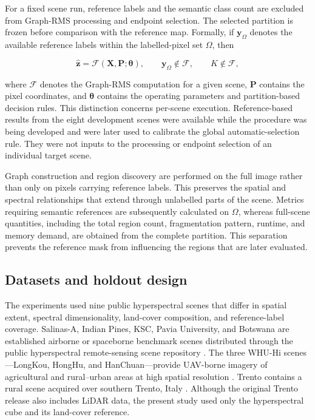 \documentclass[10pt,a4paper,fleqn]{article}
\begin{document}
For a fixed scene run, reference labels and the semantic class count are
excluded from Graph-RMS processing and endpoint selection. The selected
partition is frozen before comparison with the reference map. Formally, if
\(\mathbf{y}_{\Omega}\) denotes the available reference labels within the
labelled-pixel set \(\Omega\), then

\begin{equation}
\widehat{\mathbf{z}}
=
\mathcal{F}
\left(
\mathbf{X},
\mathbf{P};
\boldsymbol{\theta}
\right),
\qquad
\mathbf{y}_{\Omega}\notin
\mathcal{F},
\qquad
K\notin
\mathcal{F},
\end{equation}

where \(\mathcal{F}\) denotes the Graph-RMS computation for a given scene,
\(\mathbf{P}\) contains the pixel coordinates, and
\(\boldsymbol{\theta}\) contains the operating parameters and partition-based
decision rules. This distinction concerns per-scene execution. Reference-based
results from the eight development scenes were available while the procedure
was being developed and were later used to calibrate the global
automatic-selection rule. They were not inputs to the processing or endpoint
selection of an individual target scene.

Graph construction and region discovery are performed on the full image rather
than only on pixels carrying reference labels. This preserves the spatial and
spectral relationships that extend through unlabelled parts of the scene.
Metrics requiring semantic references are subsequently calculated on
\(\Omega\), whereas full-scene quantities, including the total region count,
fragmentation pattern, runtime, and memory demand, are obtained from the complete
partition. This separation prevents the reference mask from influencing the
regions that are later evaluated.

\subsection{Datasets and holdout design}
\label{subsec:datasets}

The experiments used nine public hyperspectral scenes that differ in spatial
extent, spectral dimensionality, land-cover composition, and reference-label
coverage. Salinas-A, Indian Pines, KSC, Pavia University, and Botswana are
established airborne or spaceborne benchmark scenes distributed through the
public hyperspectral remote-sensing scene repository
\citep{gic_hsi_scenes}. The three WHU-Hi scenes---LongKou, HongHu, and
HanChuan---provide UAV-borne imagery of agricultural and rural--urban areas at
high spatial resolution \citep{zhong2020}. Trento contains a rural scene
acquired over southern Trento, Italy \citep{ghamisi2017}. Although the original
Trento release also includes LiDAR data, the present study used only the
hyperspectral cube and its land-cover reference.
\end{document}
